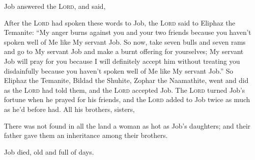 
\begin{inparaenum}
     Job answered the \textsc{Lord}, and said,\smallskip%
    
    
    
    
    
    
     After the \textsc{Lord} had spoken these words to Job, the \textsc{Lord} said to Eliphaz the Temanite: ``My anger burns against you and your two friends because you haven't spoken well of Me like My servant Job.%
     So now, take seven bulls and seven rams and go to My servant Job and make a burnt offering for yourselves; My servant Job will pray for you because I will definitely accept him without treating you disdainfully because you haven't spoken well of Me like My servant Job.''%
     So Eliphaz the Temanite, Bildad the Shuhite, Zophar the Naamathite, went and did as the \textsc{Lord} had told them, and the \textsc{Lord} accepted Job.%
     The \textsc{Lord} turned Job's fortune when he prayed for his friends, and the \textsc{Lord} added to Job twice as much as he'd before had.%
     All his brothers, sisters, %
    
     There was not found in all the land a woman as hot as Job's daughters; and their father gave them an inheritance among their brothers.%
    
     Job died, old and full of days.%
\end{inparaenum}
